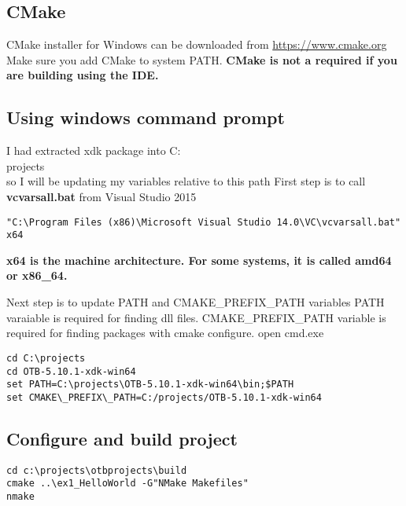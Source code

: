 \documentclass[10pt,a4paper]{article}
\begin{document}
\subsection{CMake}
CMake installer for Windows can be downloaded from \url{https://www.cmake.org}
\newline
Make sure you add CMake to system PATH.
\newline
\textbf{CMake is not a required if you are building using the IDE.}

\subsection{Using windows command prompt}

I had extracted xdk package into C:\\projects\\
\newline
so I will be updating my variables relative to this path
\newline
First step is to call \textbf{vcvarsall.bat} from Visual Studio 2015
\newline
\begin{verbatim}
"C:\Program Files (x86)\Microsoft Visual Studio 14.0\VC\vcvarsall.bat" x64
\end{verbatim}

\textbf{x64 is the machine architecture. For some systems, it is called amd64 or x86\_64.}

Next step is to update PATH and CMAKE\_PREFIX\_PATH variables
\newline
PATH varaiable is required for finding dll files.
\newline
CMAKE\_PREFIX\_PATH variable is required for finding packages with cmake configure.
\newline
\newline
open cmd.exe

\begin{verbatim}
cd C:\projects
cd OTB-5.10.1-xdk-win64 
set PATH=C:\projects\OTB-5.10.1-xdk-win64\bin;$PATH
set CMAKE\_PREFIX\_PATH=C:/projects/OTB-5.10.1-xdk-win64
\end{verbatim}



\subsection{Configure and build project}



\begin{verbatim}
cd c:\projects\otbprojects\build
cmake ..\ex1_HelloWorld -G"NMake Makefiles"
nmake
\end{verbatim}
\end{document}
